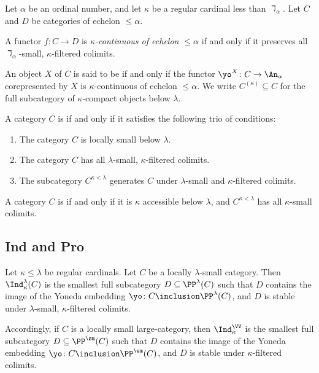 \begin{definition}
	Let $ \alpha $ be an ordinal number, and
	let $ \kappa $ be a regular cardinal less than $ \daleth_{\alpha} $.
	Let $ C $ and $ D $ be categories
	of echelon $ \leq \alpha $.

	A functor $ f \colon C \to D $
	is \emph{$ \kappa $-continuous of echelon  $ \leq \alpha $} if and only if 
	it preserves all $ \daleth_{\alpha} $-small, $ \kappa $-filtered colimits.
	
	An object $ X $ of $ C $
	is said to be  if and only if
	the functor $ \yo^X \colon C \to \An_{\alpha} $ corepresented by $ X $
	is $ \kappa $-continuous of echelon $ \leq \alpha $.
	We write $ C^{(\kappa)} \subseteq C $
	for the full subcategory of $ \kappa $-compact objects below $ \lambda $.

	A category $C$ is
	 if and only if
	it satisfies the following trio of conditions:
	\begin{enumerate}
		\item The category $ C $ is locally small below $ \lambda $.
		\item The category $ C $ has all $ \lambda $-small, $ \kappa $-filtered colimits.
		\item The subcategory $ C^{\kappa < \lambda} $
			generates $ C $ under $ \lambda $-small and 
			$ \kappa $-filtered colimits.
	\end{enumerate}
	
	A category $C$ is
	if and only if
	it is $ \kappa $ accessible below $ \lambda $, and  
	$ C^{\kappa < \lambda} $ has all $ \kappa $-small colimits.
\end{definition}

\subsection{Ind and Pro}%
\label{sub:ind_and_pro}

\begin{definition}
	Let $ \kappa \leq \lambda $ be regular cardinals.
	Let $ C $ be a locally $ \lambda $-small category.
	Then $ \Ind_{\kappa}^{\lambda}(C) $ is
	the smallest full subcategory $ D \subseteq \PP^{\lambda}(C) $
	such that $ D $ contains the image
	of the Yoneda embedding
	$ \yo \colon C \inclusion \PP^{\lambda}(C) $,
	and $ D $ is stable under
	$ \lambda $-small, $ \kappa $-filtered colimits.

	Accordingly, if $ C $ is a locally small large-category,
	then $ \Ind_{\kappa}^{\VV} $ is
	the smallest full subcategory $ D \subseteq \PP^{\sm}(C) $
	such that $ D $ contains the image
	of the Yoneda embedding
	$ \yo \colon C \inclusion \PP^{\sm}(C) $,
	and $ D $ is stable under $ \kappa $-filtered colimits.
\end{definition}

